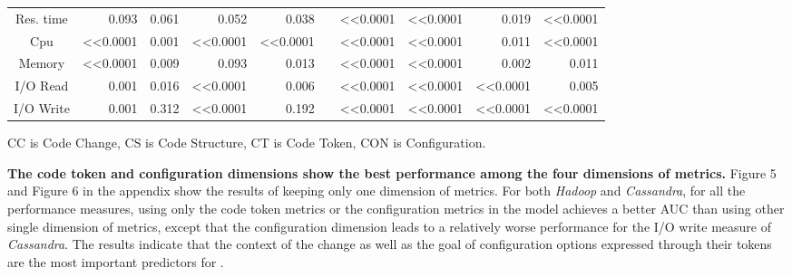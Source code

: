 \begin{table}
\begin{tabular}{|c|r|r|r|r|r|r|r|r|r|}
    Res. time & 0.093    & 0.061    & 0.052  & 0.038     &                       & \textless{}\textless{}0.0001   & \textless{}\textless{}0.0001  & 0.019& \textless{}\textless{}0.0001   \\ \cline{1-5} \cline{7-10} 
    Cpu       & \textless{}\textless{}0.0001      & 0.001    & \textless{}\textless{}0.0001    & \textless{}\textless{}0.0001       &                       & \textless{}\textless{}0.0001   & \textless{}\textless{}0.0001  & 0.011& \textless{}\textless{}0.0001   \\ \cline{1-5} \cline{7-10} 
    Memory    & \textless{}\textless{}0.0001      & 0.009    & 0.093  & 0.013     &                       & \textless{}\textless{}0.0001   & \textless{}\textless{}0.0001  & 0.002& 0.011 \\ \cline{1-5} \cline{7-10} 
    I/O Read  & 0.001    & 0.016    & \textless{}\textless{}0.0001    & 0.006     &                       & \textless{}\textless{}0.0001   & \textless{}\textless{}0.0001  & \textless{}\textless{}0.0001  & 0.005 \\ \cline{1-5} \cline{7-10} 
    I/O Write & 0.001    & 0.312    & \textless{}\textless{}0.0001    & 0.192     &                       & \textless{}\textless{}0.0001   & \textless{}\textless{}0.0001  & \textless{}\textless{}0.0001  & \textless{}\textless{}0.0001   \\ \cline{1-5} \cline{7-10} 
    \end{tabular}
\label{tab:difference}
\footnotesize{CC is Code Change, CS is Code Structure, CT is Code Token, CON is Configuration.}
\end{table}

\textbf{The code token and configuration dimensions show the best performance among the four dimensions of metrics.} Figure 5 and Figure 6 in the appendix %
show the results of keeping only one dimension of metrics. For both \emph{Hadoop} and \emph{Cassandra}, for all the performance measures, using only the code token metrics or the configuration metrics in the model achieves a better AUC than using other single dimension of metrics, except that the configuration dimension leads to a relatively worse performance for the I/O write measure of \emph{Cassandra}.
The results indicate that the context of the change as well as the goal of configuration options expressed through their tokens are the most important predictors for \inconsistent. %

